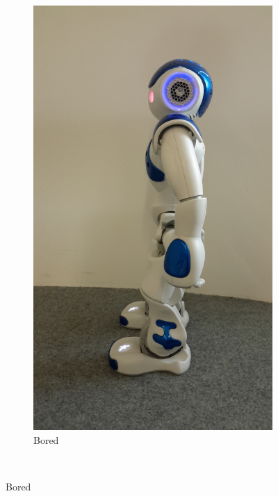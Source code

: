 \documentclass[a4paper, 10pt, conference]{ieeeconf}      %
\begin{document}
\begin{figure}
        ~ %
        \begin{subfigure}[b]{0.18\textwidth}
                \includegraphics[width=\textwidth]{../dissertation/figures/bored.jpg}
                \caption{Bored}
                \label{fig:bored}
        \end{subfigure}
        ~ %

\end{figure}
\end{document}
